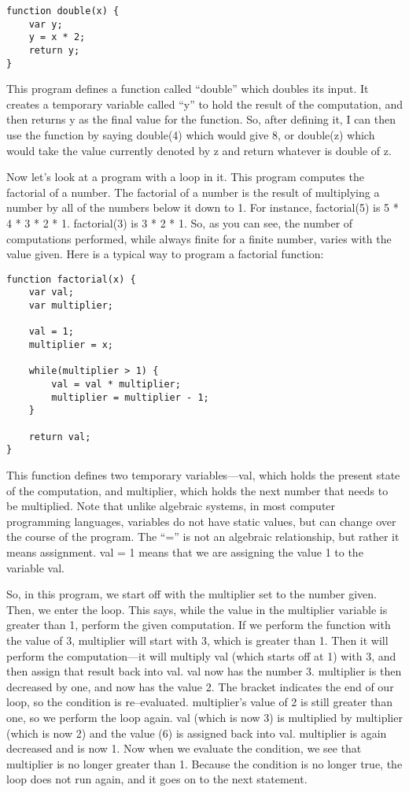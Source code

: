 \begin{verbatim}
function double(x) {
	var y;
	y = x * 2;
	return y;
}
\end{verbatim}

This program defines a function called ``double'' which doubles its input.  It creates a temporary variable called ``y'' to hold the result of the computation, and then returns y as the final value for the function.  So, after defining it, I can then use the function by saying double(4) which would give 8, or double(z) which would take the value currently denoted by z and return whatever is double of z.

Now let's look at a program with a loop in it.  This program computes the factorial of a number.  The factorial of a number is the result of multiplying a number by all of the numbers below it down to 1.  For instance, factorial(5) is 5 * 4 * 3 * 2 * 1.  factorial(3) is 3 * 2 * 1.  So, as you can see, the number of computations performed, while always finite for a finite number, varies with the value given.  Here is a typical way to program a factorial function:

\begin{verbatim}
function factorial(x) {
	var val;
	var multiplier;

	val = 1;
	multiplier = x;

	while(multiplier > 1) {
		val = val * multiplier;
		multiplier = multiplier - 1;
	}

	return val;
}
\end{verbatim}

This function defines two temporary variables---val, which holds the present state of the computation, and multiplier, which holds the next number that needs to be multiplied.  Note that unlike algebraic systems, in most computer programming languages, variables do not have static values, but can change over the course of the program.  The ``='' is not an algebraic relationship, but rather it means assignment.  val = 1 means that we are assigning the value 1 to the variable val.  

So, in this program, we start off with the multiplier set to the number given.  Then, we enter the loop.  This says, while the value in the multiplier variable is greater than 1, perform the given computation.  If we perform the function with the value of 3, multiplier will start with 3, which is greater than 1.  Then it will perform the computation---it will multiply val (which starts off at 1) with 3, and then assign that result back into val.  val now has the number 3.  multiplier is then decreased by one, and now has the value 2.  The bracket indicates the end of our loop, so the condition is re--evaluated.  multiplier's value of 2 is still greater than one, so we perform the loop again.  val (which is now 3) is multiplied by multiplier (which is now 2) and the value (6) is assigned back into val.  multiplier is again decreased and is now 1.  Now when we evaluate the condition, we see that multiplier is no longer greater than 1.  Because the condition is no longer true, the loop does not run again, and it goes on to the next statement.  

